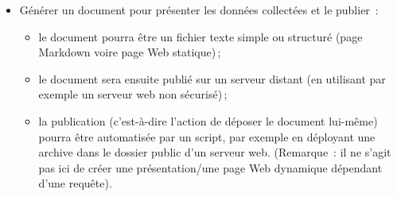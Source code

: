 {\begin{itemize}
\begin{itemize}
    isoler/choisir/organiser les informations pertinentes\,;
  \item
    extraire des statistiques (moyennes, histogrammes)\,;
  \item
    produire des représentations graphiques (nuage de mots, tableaux
    comparatifs).
  \end{itemize}
\item
  Générer un document pour présenter les données collectées et le
  publier~:
  \begin{itemize}
  \item
    le document pourra être un fichier texte simple ou structuré (page
    Markdown voire page Web statique)\,;
  \item
    le document sera ensuite publié sur un serveur distant (en utilisant
    par exemple un serveur web non
    sécurisé)\,;
  \item
    la publication (c'est-à-dire l'action de déposer le document
    lui-même) pourra être automatisée par
    un script, par exemple en déployant une archive dans le dossier
    public d'un serveur web. (Remarque~:
    il ne s'agit pas ici de créer une présentation/une page Web
    dynamique dépendant d'une requête).
  \end{itemize}
\end{itemize}
}




